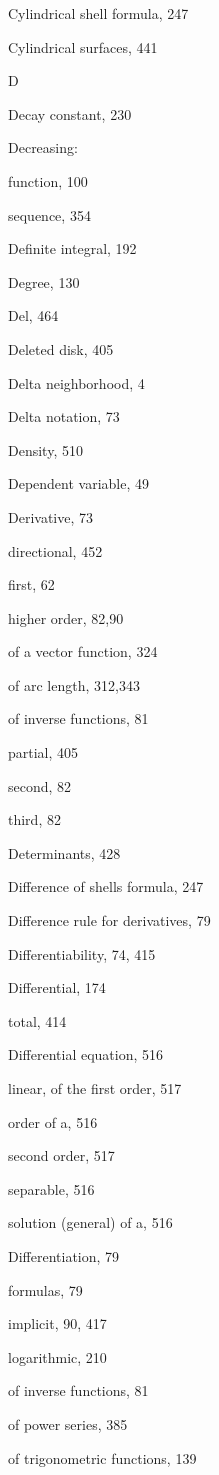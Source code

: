 \documentclass[10pt]{article}
\begin{document}
Cylindrical shell formula, 247

Cylindrical surfaces, 441

D

Decay constant, 230

Decreasing:

function, 100

sequence, 354

Definite integral, 192

Degree, 130

Del, 464

Deleted disk, 405

Delta neighborhood, 4

Delta notation, 73

Density, 510

Dependent variable, 49

Derivative, 73

directional, 452

first, 62

higher order, 82,90

of a vector function, 324

of arc length, 312,343

of inverse functions, 81

partial, 405

second, 82

third, 82

Determinants, 428

Difference of shells formula, 247

Difference rule for derivatives, 79

Differentiability, 74, 415

Differential, 174

total, 414

Differential equation, 516

linear, of the first order, 517

order of a, 516

second order, 517

separable, 516

solution (general) of a, 516

Differentiation, 79

formulas, 79

implicit, 90, 417

logarithmic, 210

of inverse functions, 81

of power series, 385

of trigonometric functions, 139
\end{document}
